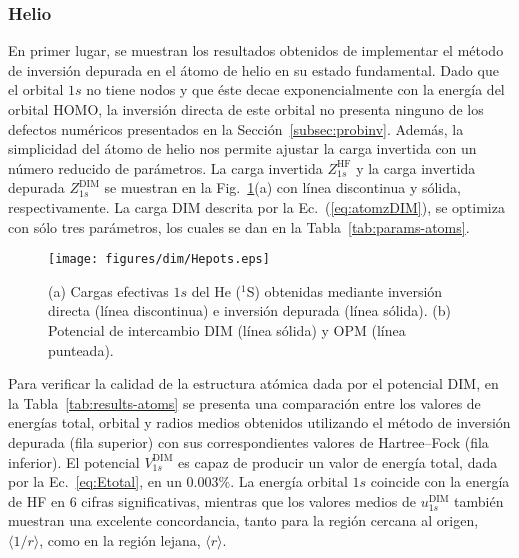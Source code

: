 \subsubsection*{Helio}

En primer lugar, se muestran los resultados obtenidos de implementar
el método de inversión depurada en el átomo de helio en su estado
fundamental. Dado que el orbital $1s$ no tiene nodos y que éste 
decae exponencialmente con la energía del orbital HOMO, la inversión 
directa de este orbital no presenta ninguno de los defectos numéricos
presentados en la Sección~\ref{subsec:probinv}. Además, la simplicidad 
del átomo de helio nos permite ajustar la carga invertida con un número 
reducido de parámetros. La carga invertida $Z_{1s}^{\mathrm{HF}}$ y la
carga invertida depurada $Z_{1s}^{\mathrm{DIM}}$ se muestran en la 
Fig.~\ref{fig:Hepots}(a) con línea discontinua y sólida, 
respectivamente. La carga DIM descrita por la Ec.~(\ref{eq:atomzDIM}), 
se optimiza con sólo tres parámetros, los cuales se dan en la 
Tabla~\ref{tab:params-atoms}. 

\begin{figure}[t]
\centering
\texttt{[image: figures/dim/Hepots.eps]}
\caption[Cargas efectivas y potencial de intercambio DIM de He.]
{(a) Cargas efectivas $1s$ del He ($^1$S) obtenidas mediante inversión 
directa (línea discontinua) e inversión depurada (línea sólida). 
(b) Potencial de intercambio DIM (línea sólida) y OPM (línea punteada).}
\label{fig:Hepots}
\end{figure}

Para verificar la calidad de la estructura atómica dada por el potencial 
DIM, en la Tabla~\ref{tab:results-atoms} se presenta una comparación 
entre los valores de energías total, orbital y radios medios obtenidos 
utilizando el método de inversión depurada (fila superior) con sus 
correspondientes valores de Hartree--Fock (fila inferior). El potencial 
$V_{1s}^{\mathrm{ DIM}}$ es capaz de producir un valor de energía total, 
dada por la Ec.~\ref{eq:Etotal}, en un $0.003\%$. La energía orbital 
$1s$ coincide con la energía de HF en 6 cifras significativas, mientras 
que los valores medios de $u_{1s}^{\mathrm{DIM}}$ también muestran una 
excelente concordancia, tanto para la región cercana al origen, 
$\langle 1/r\rangle$, como en la región lejana, $\langle r\rangle$.

